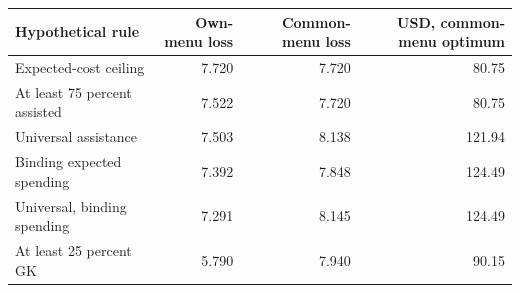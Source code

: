 \begin{tabular}{lrrr}
\toprule
Hypothetical rule & Own-menu loss & Common-menu loss & USD, common-menu optimum \\
\midrule
Expected-cost ceiling & 7.720 & 7.720 & 80.75 \\
At least 75 percent assisted & 7.522 & 7.720 & 80.75 \\
Universal assistance & 7.503 & 8.138 & 121.94 \\
Binding expected spending & 7.392 & 7.848 & 124.49 \\
Universal, binding spending & 7.291 & 8.145 & 124.49 \\
At least 25 percent GK & 5.790 & 7.940 & 90.15 \\
\bottomrule
\end{tabular}
